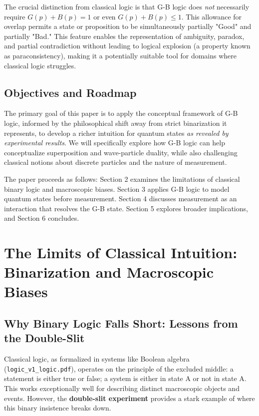 \documentclass{article}
\begin{document}
The crucial distinction from classical logic is that G-B logic does \textit{not} necessarily require $G(p) + B(p) = 1$ or even $G(p) + B(p) \le 1$. This allowance for overlap permits a state or proposition to be simultaneously partially "Good" and partially "Bad." This feature enables the representation of ambiguity, paradox, and partial contradiction without leading to logical explosion (a property known as paraconsistency), making it a potentially suitable tool for domains where classical logic struggles.

\subsection{Objectives and Roadmap}

The primary goal of this paper is to apply the conceptual framework of G-B logic, informed by the philosophical shift away from strict binarization it represents, to develop a richer intuition for quantum states \textit{as revealed by experimental results}. We will specifically explore how G-B logic can help conceptualize superposition and wave-particle duality, while also challenging classical notions about discrete particles and the nature of measurement.

The paper proceeds as follows: Section 2 examines the limitations of classical binary logic and macroscopic biases. Section 3 applies G-B logic to model quantum states before measurement. Section 4 discusses measurement as an interaction that resolves the G-B state. Section 5 explores broader implications, and Section 6 concludes.

\section{The Limits of Classical Intuition: Binarization and Macroscopic Biases}

\subsection{Why Binary Logic Falls Short: Lessons from the Double-Slit}

Classical logic, as formalized in systems like Boolean algebra (\texttt{logic\_v1\_logic.pdf}), operates on the principle of the excluded middle: a statement is either true or false; a system is either in state A or not in state A. This works exceptionally well for describing distinct macroscopic objects and events. However, the \textbf{double-slit experiment} provides a stark example of where this binary insistence breaks down.
\end{document}
